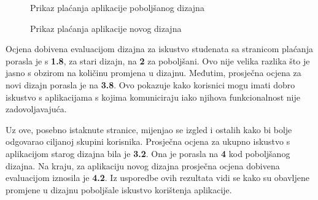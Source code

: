 \documentclass[times, utf8, zavrsni, numeric]{fer}
\begin{document}
    \begin{figure} [H]
      \centering
      \caption{Prikaz plaćanja aplikacije poboljšanog dizajna}
    \end{figure}
    
    \begin{figure} [H]
      \centering
      \caption{Prikaz plaćanja aplikacije novog dizajna}
    \end{figure}
    
    Ocjena dobivena evaluacijom dizajna za iskustvo studenata sa stranicom plaćanja porasla je s \textbf{1.8}, za stari dizajn, na \textbf{2} za poboljšani. Ovo nije velika razlika što je jasno s obzirom na količinu promjena u dizajnu. Međutim, prosječna ocjena za novi dizajn porasla je na \textbf{3.8}. Ovo pokazuje kako korisnici mogu imati dobro iskustvo s aplikacijama s kojima komuniciraju iako njihova funkcionalnost nije zadovoljavajuća.
    
    Uz ove, posebno istaknute stranice, mijenjao se izgled i ostalih kako bi bolje odgovarao ciljanoj skupini korisnika. Prosječna ocjena za ukupno iskustvo s aplikacijom starog dizajna bila je \textbf{3.2}. Ona je porasla na \textbf{4} kod poboljšanog dizajna. Na kraju, za aplikaciju novog dizajna prosječna ocjena dobivena evaluacijom iznosila je \textbf{4.2}. Iz usporedbe ovih rezultata vidi se kako su obavljene promjene u dizajnu poboljšale iskustvo korištenja aplikacije.
\end{document}
